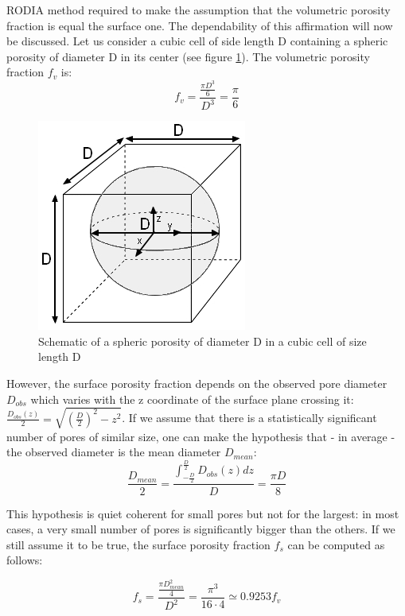 RODIA method required to make the assumption that the volumetric porosity fraction is equal the surface one. The dependability of this affirmation will now be discussed. Let us consider a cubic cell of side length D containing a spheric porosity of diameter D in its center (see figure \ref{fig:DDD}). The volumetric porosity fraction $f_v$ is:\\

$$f_v = \frac{\frac{\pi D^3}{6}}{D^3}= \frac{\pi}{6}$$

\begin{figure}[ht]
	\centering
	\centerline{\includegraphics[scale=0.64]{Images/DDD}}
	\decoRule
	\caption[Schematic of a spheric porosity of diameter D in a cubic cell of size length D]{Schematic of a spheric porosity of diameter D in a cubic cell of size length D}
	\label{fig:DDD}
\end{figure}

However, the surface porosity fraction depends on the observed pore diameter $D_{obs}$ which varies with the z coordinate of the surface plane crossing it: $\frac{D_{obs}(z)}{2}=\sqrt{(\frac{D}{2})^2-z^2}$. If we assume that there is a statistically significant number of pores of similar size, one can make the hypothesis that - in average - the observed diameter is the mean diameter $D_{mean}$:\\

$$ \frac{D_{mean}}{2}= \frac{\int_{-\frac{D}{2}}^\frac{D}{2} D_{obs}(z) dz}{D}=\frac{\pi D}{8}$$

This hypothesis is quiet coherent for small pores but not  for the largest: in most cases, a very small number of pores is significantly bigger than the others. If we still assume it to be true, the surface porosity fraction $f_s$ can be computed as follows:

$$f_s=\frac{\frac{\pi D_{mean}^2}{4}}{D^2}=\frac{\pi^3}{16 \cdot 4} \simeq 0.9253 f_v$$


